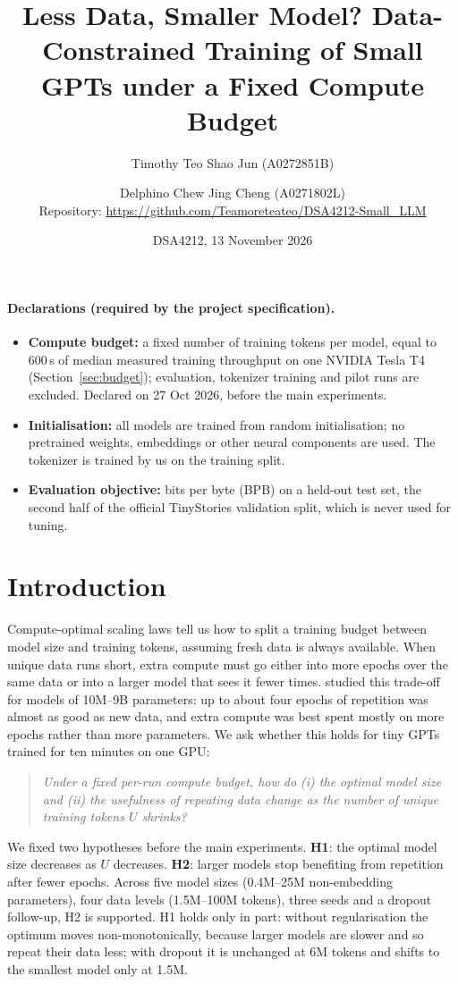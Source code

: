 \documentclass[11pt]{article}
\title{Less Data, Smaller Model? Data-Constrained Training of Small GPTs under a Fixed Compute Budget}
\author{Timothy Teo Shao Jun (A0272851B) \and Delphino Chew Jing Cheng (A0271802L)\\[4pt]
\small Repository: \url{https://github.com/Teamoreteateo/DSA4212-Small_LLM}}
\date{DSA4212, 13 November 2026}
\begin{document}
\maketitle

\paragraph{Declarations (required by the project specification).}
\begin{itemize}
\item \textbf{Compute budget:} a fixed number of training tokens per model, equal to 600\,s of median
  measured training throughput on one NVIDIA Tesla T4 (Section~\ref{sec:budget}); evaluation, tokenizer
  training and pilot runs are excluded. Declared on 27 Oct 2026, before the main experiments.
\item \textbf{Initialisation:} all models are trained from random initialisation; no pretrained weights,
  embeddings or other neural components are used. The tokenizer is trained by us on the training split.
\item \textbf{Evaluation objective:} bits per byte (BPB) on a held-out test set, the second half of the
  official TinyStories validation split, which is never used for tuning.
\end{itemize}

\section{Introduction}
Compute-optimal scaling laws \citep{kaplan2020scaling,hoffmann2022chinchilla} tell us how to split a
training budget between model size and training tokens, assuming fresh data is always available. When unique
data runs short, extra compute must go either into more epochs over the same data or into a larger model that
sees it fewer times. \citet{muennighoff2023scaling} studied this trade-off for models of 10M--9B parameters:
up to about four epochs of repetition was almost as good as new data, and extra compute was best spent mostly 
on more epochs rather than more parameters. We ask whether this holds for tiny GPTs trained for ten minutes on one GPU:
\begin{quote}\emph{Under a fixed per-run compute budget, how do (i) the optimal model size and (ii) the
usefulness of repeating data change as the number of unique training tokens $U$ shrinks?}\end{quote}
\noindent We fixed two hypotheses before the main experiments. \textbf{H1}: the optimal model size decreases
as $U$ decreases. \textbf{H2}: larger models stop benefiting from repetition after fewer epochs.
Across five model sizes (0.4M--25M non-embedding parameters), four data levels (1.5M--100M tokens), three
seeds and a dropout follow-up, H2 is supported. H1 holds only in part: without regularisation the optimum
moves non-monotonically, because larger models are slower and so repeat their data less; with dropout it is
unchanged at 6M tokens and shifts to the smallest model only at 1.5M.
\end{document}
